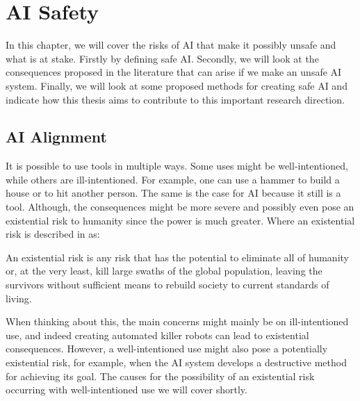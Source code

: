 \documentclass[12pt,A4]{report}
\theoremstyle{definition}
\begin{document}


\chapter{AI Safety}
In this chapter, we will cover the risks of AI that make it possibly unsafe and what is at stake. Firstly by defining safe AI. Secondly, we will look at the consequences proposed in the literature that can arise if we make an unsafe AI system. Finally, we will look at some proposed methods for creating safe AI and indicate how this thesis aims to contribute to this important research direction.

\section{AI Alignment}
It is possible to use tools in multiple ways. Some uses might be well-intentioned, while others are ill-intentioned. For example, one can use a hammer to build a house or to hit another person. The same is the case for AI because it still is a tool. Although, the consequences might be more severe and possibly even pose an existential risk to humanity since the power is much greater. Where an existential risk is described in \citet{FLI} as:
\begin{displayquote}
An existential risk is any risk that has the potential to eliminate all of humanity or, at the very least, kill large swaths of the global population, leaving the survivors without sufficient means to rebuild society to current standards of living.
\end{displayquote}

When thinking about this, the main concerns might mainly be on ill-intentioned use, and indeed creating automated killer robots can lead to existential consequences. However, a well-intentioned use might also pose a potentially existential risk, for example, when the AI system develops a destructive method for achieving its goal. The causes for the possibility of an existential risk occurring with well-intentioned use we will cover shortly. 

\end{document}
